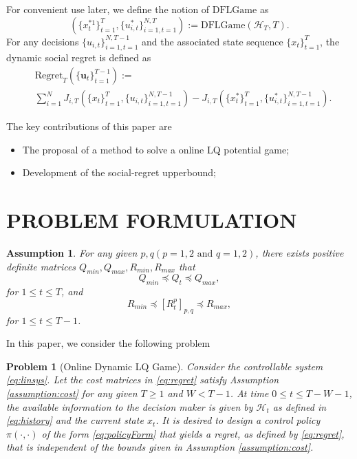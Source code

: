\documentclass[letterpaper, 10 pt, conference]{ieeeconf}  %
\newcommand{\usequence}[2]{\{u_{i,t}\}_{i=1,t=1}^{#1,#2}}
\newtheorem{problem}{Problem}
\newtheorem{assumption}{Assumption}
\begin{document}
For convenient use later, we define the notion of $\text{DFLGame}$ as
\begin{equation}\label{eq:regret}
 (\{x_{t}^{*1}\}_{t=1}^{T}, \{u_{i,t}^{*}\}_{i=1,t=1}^{N,T}) := \text{DFLGame}(\mathcal{H}_{T},T).
\end{equation}
For any decisions $\usequence{N}{T-1}$ and the associated state sequence $\{x_{t}\}_{t=1}^{T}$, the dynamic social regret is defined as
\begin{equation}
    \begin{split}
        &\text{Regret}_{T}(\{\mathbf{u}_{t}\}_{t=1}^{T-1}) := \\
        &\sum_{i=1}^{N} J_{i,T}(\{x_{t}\}_{t=1}^{T},\{u_{i,t}\}_{i=1,t=1}^{N,T-1}) - J_{i,T}(\{x_{t}^{*}\}_{t=1}^{T},\{u_{i,t}^{*}\}_{i=1,t=1}^{N,T-1}).
    \end{split}
\end{equation}


The key contributions of this paper are
\begin{itemize}
    \item The proposal of a method to solve a online LQ potential game;
    \item Development of the social-regret upperbound;
\end{itemize}


\section{PROBLEM FORMULATION}
\begin{assumption}\label{Assumption:bounds}
    For any given $p,q(p={1,2}\text{ and }q={1,2})$, there exists positive definite matrices $Q_{min}, Q_{max}, R_{min}, R_{max}$ that
    \begin{equation}
        Q_{min} \preceq Q_{t} \preceq Q_{max},
    \end{equation}
    for $1\leq t \leq T$, and
    \begin{equation}
        R_{min} \preceq [R_{t}^{p}]_{p,q} \preceq R_{max},
    \end{equation}
    for $1 \leq t \leq T-1$.
\end{assumption}
In this paper, we consider the following problem
\begin{problem}[Online Dynamic LQ Game]
     Consider the controllable system \eqref{eq:linsys}. Let the cost matrices in \eqref{eq:regret} satisfy Assumption \ref{assumption:cost} for any given $T \geq 1$ and $W < T-1$. At time $0 \leq t \leq T-W-1$, the available information to the decision maker is given by $\mathcal{H}_{t}$ as defined in \eqref{eq:history} and the current state $x_{t}$. It is desired to design a control policy $\pi(\cdot, \cdot)$ of the form \eqref{eq:policyForm} that yields a regret, as defined by \eqref{eq:regret}, that is independent of the bounds given in Assumption \ref{assumption:cost}.
\end{problem}
\end{document}

